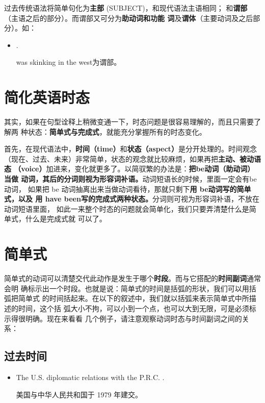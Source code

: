 过去传统语法将简单句化为\textbf{主部} (SUBJECT)，和现代语法主语相同；
和\textbf{谓部}（主语之后的部分）。而谓部又可分为\textbf{助动词和功能
  词}及\textbf{谓体}（主要动词及之后部分）。如：
\begin{itemize}
\item {}  .

  was skinking in the west为谓部。
\end{itemize}

\section{简化英语时态}

其实，如果在句型诠释上稍微变通一下，时态问题是很容易理解的，而且只需要了解两
种状态：\textbf{简单式与完成式}，就能充分掌握所有的时态变化。

首先，在现代语法中，\textbf{时间（time）}和\textbf{状态（aspect）}是分开处理的。时间观念
（现在、过去、未来）非常简单，状态的观念就比较麻烦，如果再把\textbf{主动、被动语态
  （voice）}加进来，变化就更多了。以简驭繁的办法是：\textbf{把be动词（助动词）当做
  动词，其后的分词则视为形容词补语。}动词短语长的时候，里面一定会有be 动词，
如果把 be 动词抽离出来当做动词看待，那就只剩下\textbf{用 be动词写的简单式，以及
  用 have been写的完成式两种状态。}分词则可视为形容词补语，不放在动词短语里面，
如此一来整个时态的问题就会简单化，我们只要弄清楚什么是简单式，什么是完成式就
可以了。

\section{简单式}

简单式的动词可以清楚交代此动作是发生于哪个\textbf{时段}。而与它搭配的\textbf{时间副词}通常会明
确标示出一个时段。也就是说：简单式的时间是括弧的形状，我们可以用括弧把简单式
的时间括起来。在以下的叙述中，我们就以括弧来表示简单式中所描述的时间，这个括
弧大小不拘，可以小到一个点，也可以大到无限，可是必须标示得很明确。现在来看看
几个例子，请注意观察动词时态与时间副词之间的关系：

\subsection{过去时间}

\begin{itemize}
\item The U.S.  diplomatic relations with the P.R.C. .

  美国与中华人民共和国于 1979 年建交。
\end{itemize}

